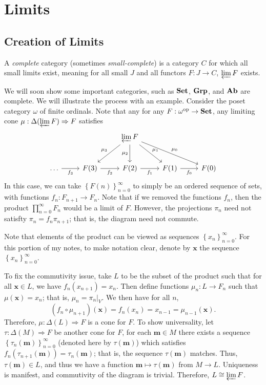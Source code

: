 \chapter{Limits}

\section{Creation of Limits}

\begin{definition}[Complete]\label{dfn:5.1}
	A \emph{complete} category (sometimes \emph{small-complete}) is a category $C$ for which all small limits exist, meaning for all small $J$ and all functors $F : J \to C$, $\varprojlim F$ exists.
\end{definition}

We will soon show some important categories, such as $\mathbf{Set} $, $\mathbf{Grp} $, and $\mathbf{Ab}$ are complete. We will illustrate the process with an example. Consider the poset category $\omega $ of finite ordinals. Note that any for any $F : \omega ^{\mathrm{op} }  \to \mathbf{Set} $, any limiting cone $\mu : \Delta (\varprojlim F) \Rightarrow F$ satisfies
\[\begin{tikzcd}[row sep = 2.5em, column sep = 2.5em]
 &  & \varprojlim F \ar[" \mu _3 "', dl] \ar[" \mu _2 "', d] \ar[" \mu _1 ", dr] \ar[" \mu _0 ", drr]  &  &  \\
\ldots \ar[" f_3 "', r]  & F(3)\ar[" f_2 "', r]  & F(2)\ar[" f_1"', r]  & F(1)\ar[" f_0 "', r]  & F(0)
\end{tikzcd}\]
In this case, we can take $\left\{ F(n) \right\}_{n=0}^\infty $ to simply be an ordered sequence of sets, with functions $f_n : F_{n+1}  \to F_n$. Note that if we removed the functions $f_n$, then the product $\prod_{n=0}^{\infty } F_n$ would be a limit of $F$. However, the projections $\pi _n$ need not satisfty $\pi_n=f_n \pi _{n+1} $; that is, the diagram need not commute.
 
Note that elements of the product can be viewed as sequences $\left\{ x_n \right\}_{n=0} ^\infty $. For this portion of my notes, to make notation clear, denote by $\mathbf{x} $ the sequence $\left\{ x_n \right\}_{n=0} ^\infty $.

To fix the commutivity issue, take $L$ to be the subset of the product such that for all $\mathbf{x} \in L$, we have $f_n(x_{n+1} )=x_{n} $. Then define functions $\mu _n : L \to F_n$ such that $\mu (\mathbf{x} )=x_n$; that is, $\mu _n = \pi _n|_V$. We then have for all $n$,
\[
	(f_n \circ \mu_{n+1} )(\mathbf{x} )=f_n(x_n)=x_{n-1} =\mu_{n-1} (\mathbf{x} )
.\]
Therefore, $\mu : \Delta (L) \Rightarrow F$ is a cone for $F$. To show universality, let $\tau : \Delta (M) \Rightarrow F$ be another cone for $F$, for each $\mathbf{m} \in M$ there exists a sequence $\left\{ \tau_n(\mathbf{m} ) \right\}_{n=0} ^\infty$ (denoted here by $\tau (\mathbf{m} )$) which satisfies $f_n(\tau_{n+1} (\mathbf{m} ))=\tau _n(\mathbf{m} )$; that is, the sequence $\tau (\mathbf{m} )$ matches. Thus, $\tau (\mathbf{m} )\in L$, and thus we have a function $\mathbf{m} \mapsto \tau (\mathbf{m} )$ from $M\to L$. Uniqueness is manifest, and commutivity of the diagram is trivial. Therefore, $L\cong \varprojlim F$.

